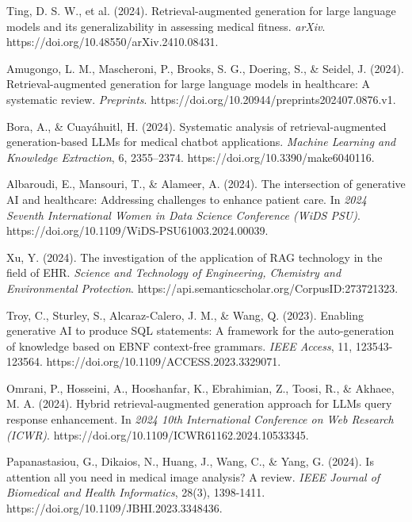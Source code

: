 Ting, D. S. W., et al. (2024). Retrieval-augmented generation for large language models and its generalizability in assessing medical fitness. \textit{arXiv}. https://doi.org/10.48550/arXiv.2410.08431.

Amugongo, L. M., Mascheroni, P., Brooks, S. G., Doering, S., & Seidel, J. (2024). Retrieval-augmented generation for large language models in healthcare: A systematic review. \textit{Preprints}. https://doi.org/10.20944/preprints202407.0876.v1.

Bora, A., & Cuayáhuitl, H. (2024). Systematic analysis of retrieval-augmented generation-based LLMs for medical chatbot applications. \textit{Machine Learning and Knowledge Extraction}, 6, 2355–2374. https://doi.org/10.3390/make6040116.

Albaroudi, E., Mansouri, T., & Alameer, A. (2024). The intersection of generative AI and healthcare: Addressing challenges to enhance patient care. In \textit{2024 Seventh International Women in Data Science Conference (WiDS PSU)}. https://doi.org/10.1109/WiDS-PSU61003.2024.00039.

Xu, Y. (2024). The investigation of the application of RAG technology in the field of EHR. \textit{Science and Technology of Engineering, Chemistry and Environmental Protection}. https://api.semanticscholar.org/CorpusID:273721323.

Troy, C., Sturley, S., Alcaraz-Calero, J. M., & Wang, Q. (2023). Enabling generative AI to produce SQL statements: A framework for the auto-generation of knowledge based on EBNF context-free grammars. \textit{IEEE Access}, 11, 123543-123564. https://doi.org/10.1109/ACCESS.2023.3329071.

Omrani, P., Hosseini, A., Hooshanfar, K., Ebrahimian, Z., Toosi, R., & Akhaee, M. A. (2024). Hybrid retrieval-augmented generation approach for LLMs query response enhancement. In \textit{2024 10th International Conference on Web Research (ICWR)}. https://doi.org/10.1109/ICWR61162.2024.10533345.

Papanastasiou, G., Dikaios, N., Huang, J., Wang, C., & Yang, G. (2024). Is attention all you need in medical image analysis? A review. \textit{IEEE Journal of Biomedical and Health Informatics}, 28(3), 1398-1411. https://doi.org/10.1109/JBHI.2023.3348436. 